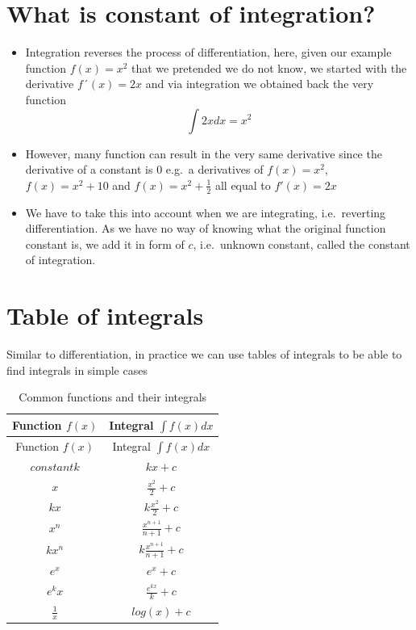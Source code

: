 \documentclass[
]{book}
\providecommand{\tightlist}{%
  \setlength{\itemsep}{0pt}\setlength{\parskip}{0pt}}
\theoremstyle{definition}
\theoremstyle{definition}
\theoremstyle{definition}
\theoremstyle{remark}
\begin{document}
\hypertarget{what-is-constant-of-integration}{%
\section{What is constant of integration?}\label{what-is-constant-of-integration}}

\begin{itemize}
\tightlist
\item
  Integration reverses the process of differentiation, here, given our example function \(f(x) = x^2\) that we pretended we do not know, we started with the derivative \(f´(x) = 2x\) and via integration we obtained back the very function \[\int 2x dx = x^2\]
\item
  However, many function can result in the very same derivative since the derivative of a constant is 0 e.g.~a derivatives of \(f(x) = x^2\), \(f(x) = x^2 + 10\) and \(f(x) = x^2 + \frac{1}{2}\) all equal to \(f'(x) = 2x\)
\item
  We have to take this into account when we are integrating, i.e.~reverting differentiation. As we have no way of knowing what the original function constant is, we add it in form of \(c\), i.e.~unknown constant, called the constant of integration.
\end{itemize}

\hypertarget{table-of-integrals}{%
\section{Table of integrals}\label{table-of-integrals}}

Similar to differentiation, in practice we can use tables of integrals to be able to find integrals in simple cases

\begin{longtable}[]{@{}cc@{}}
\caption{\label{tab:int-table} Common functions and their integrals}\tabularnewline
\toprule
Function \(f(x)\) & Integral \(\int f(x) dx\)\tabularnewline
\midrule
\endfirsthead
\toprule
Function \(f(x)\) & Integral \(\int f(x) dx\)\tabularnewline
\midrule
\endhead
\(constant k\) & \(kx + c\)\tabularnewline
\(x\) & \(\frac{x^2}{2}+c\)\tabularnewline
\(kx\) & \(k\frac{x^2}{2}+c\)\tabularnewline
\(x^n\) & \(\frac{x^{n+1}}{n+1}+c\)\tabularnewline
\(kx^n\) & \(k\frac{x^{n+1}}{n+1}+c\)\tabularnewline
\(e^x\) & \(e^x+c\)\tabularnewline
\(e^kx\) & \(\frac{e^{kx}}{k}+c\)\tabularnewline
\(\frac{1}{x}\) & \(log(x)+c\)\tabularnewline
\bottomrule
\end{longtable}
\end{document}

